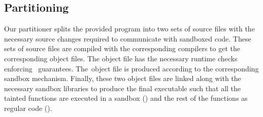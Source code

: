 \subsection{Partitioning}
Our partitioner splits the provided program into two sets of source files with the necessary source changes required to communicate with sandboxed code.
These sets of source files are compiled with the corresponding compilers to get the corresponding object files.
The \cregion object file has the necessary runtime checks enforcing~\systemname{} guarantees.
The~\ucregion object file is produced according to the corresponding sandbox mechanism.
Finally, these two object files are linked along with the necessary sandbox libraries to produce the final executable such that all the tainted functions are executed in a sandbox (\ucregion) and the rest of the functions as regular code (\cregion).



